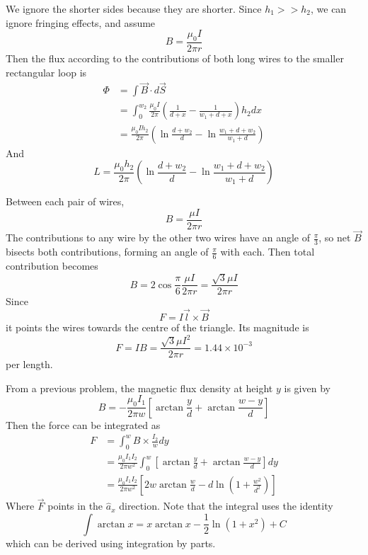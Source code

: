 \documentclass[answers]{exam}
\begin{document}
\begin{questions}
\begin{solution}
    We ignore the shorter sides because they are shorter. Since $h_1 >> h_2$, we can ignore fringing effects, and assume
    $$B = \frac{\mu_0 I}{2\pi r}$$
    Then the flux according to the contributions of both long wires to the smaller rectangular loop is
    \begin{align*}
        \Phi &= \int \vec B \cdot d\vec S \\
             &= \int_0^{w_2} \frac{\mu_0 I}{2\pi} \left(\frac{1}{d+x} - \frac{1}{w_1+d+x}\right) h_2 dx \\
             &= \frac{\mu_0 Ih_2}{2\pi} \left(\ln\frac{d+w_2}{d} - \ln\frac{w_1+d+w_2}{w_1+d}\right)
    \end{align*}
    And
    $$L = \frac{\mu_0 h_2}{2\pi} \left(\ln\frac{d+w_2}{d} - \ln\frac{w_1+d+w_2}{w_1+d}\right)$$
\end{solution}


\begin{solution}
    Between each pair of wires,
    $$B = \frac{\mu I}{2\pi r}$$
    The contributions to any wire by the other two wires have an angle of $\frac{\pi}{3}$, so net $\vec B$ bisects both contributions, forming an angle of $\frac{\pi}{6}$ with each. Then total contribution becomes
    $$B = 2\cos\frac{\pi}{6} \frac{\mu I}{2\pi r} = \frac{\sqrt{3}\mu I}{2\pi r}$$
    Since
    $$F = I\vec l \times \vec B$$
    it points the wires towards the centre of the triangle. Its magnitude is
    $$F = IB = \frac{\sqrt{3}\mu I^2}{2\pi r} = 1.44\times10^{-3}$$
    per length.
\end{solution}


\begin{solution}
    From a previous problem, the magnetic flux density at height $y$ is given by
    $$B = -\frac{\mu_0 I_1}{2\pi w} \left[\arctan\frac{y}{d} + \arctan\frac{w-y}{d}\right]$$
    Then the force can be integrated as
    \begin{align*}
        F &= \int_0^w B\times\frac{I_2}{w}dy \\
          &= \frac{\mu_0I_1I_2}{2\pi w^2} \int_0^w\left[\arctan\frac{y}{d} + \arctan\frac{w-y}{d}\right]dy \\
          &= \frac{\mu_0I_1I_2}{2\pi w^2} \left[2w\arctan\frac{w}{d} - d\ln\left(1+\frac{w^2}{d^2}\right)\right]
    \end{align*}
    Where $\vec F$ points in the $\hat a_x$ direction. Note that the integral uses the identity
    $$\int \arctan x = x\arctan x - \frac{1}{2}\ln(1+x^2) + C$$
    which can be derived using integration by parts.
\end{solution}


\end{questions}
\end{document}
